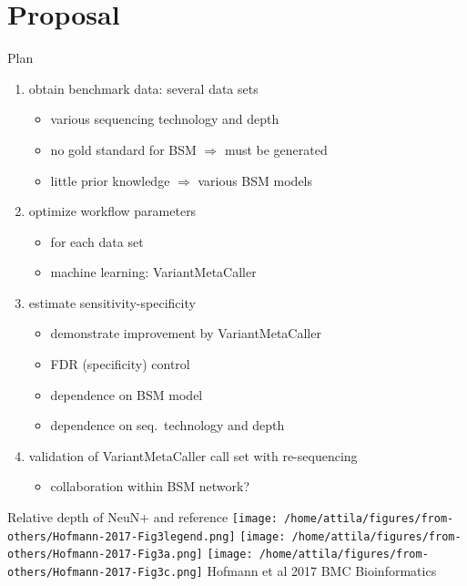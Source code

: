 \documentclass{beamer}
\begin{document}
\section{Proposal}

\begin{frame}[label=plan]{Plan}
\begin{enumerate}
\item<1> obtain benchmark data: several data sets
\begin{itemize}
\item various sequencing technology and depth 
\item no gold standard for BSM \(\Rightarrow\) must be generated
\item little prior knowledge \(\Rightarrow\) various BSM models
\end{itemize}
\item<2> optimize workflow parameters
\begin{itemize}
\item for each data set
\item machine learning: VariantMetaCaller 
\end{itemize}
\item<3> estimate sensitivity-specificity 
\begin{itemize}
\item demonstrate improvement by VariantMetaCaller
\item FDR (specificity) control
\item dependence on BSM model
\item dependence on seq.~technology and depth
\end{itemize}
\item<4> validation of VariantMetaCaller call set with re-sequencing
\begin{itemize}
\item collaboration within BSM network?
\end{itemize}
\end{enumerate}
\end{frame}


\begin{frame}{Relative depth of NeuN+ and reference}
\texttt{[image: /home/attila/figures/from-others/Hofmann-2017-Fig3legend.png]}
\texttt{[image: /home/attila/figures/from-others/Hofmann-2017-Fig3a.png]}
\texttt{[image: /home/attila/figures/from-others/Hofmann-2017-Fig3c.png]}
\vfill
\footnotesize{Hofmann et al 2017 BMC Bioinformatics}
\end{frame}
\end{document}
